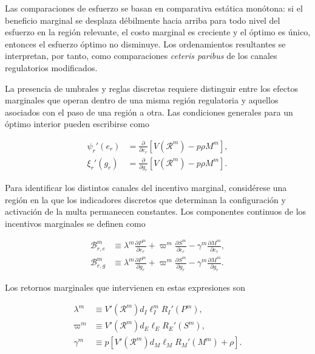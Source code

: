Las comparaciones de esfuerzo se basan en comparativa estática monótona: si el beneficio marginal se desplaza débilmente hacia arriba para todo nivel del esfuerzo en la región relevante, el costo marginal es creciente y el óptimo es único, entonces el esfuerzo óptimo no disminuye. Los ordenamientos resultantes se interpretan, por tanto, como comparaciones \textit{ceteris paribus} de los canales regulatorios modificados.

La presencia de umbrales y reglas discretas requiere distinguir entre los efectos marginales que operan dentro de una misma región regulatoria y aquellos asociados con el paso de una región a otra. Las condiciones generales para un óptimo interior pueden escribirse como

\begin{subequations}
\label{eq:foc_esperadas}
\begin{align}
\psi_r'(e_r)
&=
\frac{\partial}{\partial e_r}
\left[
V(\mathcal R^m)-p\rho M^m
\right],
\label{eq:foc_e_esperada}
\\
\xi_r'(g_r)
&=
\frac{\partial}{\partial g_r}
\left[
V(\mathcal R^m)-p\rho M^m
\right].
\label{eq:foc_g_esperada}
\end{align}
\end{subequations}

Para identificar los distintos canales del incentivo marginal, considérese una región en la que los indicadores discretos que determinan la configuración y activación de la multa permanecen constantes. Los componentes continuos de los incentivos marginales se definen como

\begin{subequations}
\label{eq:incentivos_marginales_continuos}
\begin{align}
\mathcal B_{r,e}^{m}
&\equiv
\lambda^m
\frac{\partial P^m}{\partial e_r}
+
\varpi^m
\frac{\partial S^m}{\partial e_r}
-
\gamma^m
\frac{\partial M^m}{\partial e_r},
\label{eq:incentivo_marginal_e}
\\
\mathcal B_{r,g}^{m}
&\equiv
\lambda^m
\frac{\partial P^m}{\partial g_r}
+
\varpi^m
\frac{\partial S^m}{\partial g_r}
-
\gamma^m
\frac{\partial M^m}{\partial g_r}.
\label{eq:incentivo_marginal_g}
\end{align}
\end{subequations}

Los retornos marginales que intervienen en estas expresiones son

\begin{subequations}
\label{eq:componentes_incentivos}
\begin{align}
\lambda^m
&\equiv
V'(\mathcal R^m)
d_I\ell_I^m
R_I'(P^m),
\label{eq:lambda_m}
\\
\varpi^m
&\equiv
V'(\mathcal R^m)
d_E\ell_E
R_E'(S^m),
\label{eq:varpi_m}
\\
\gamma^m
&\equiv
p
\left[
V'(\mathcal R^m)
d_M\ell_M
R_M'(M^m)
+
\rho
\right].
\label{eq:gamma_m}
\end{align}
\end{subequations}

